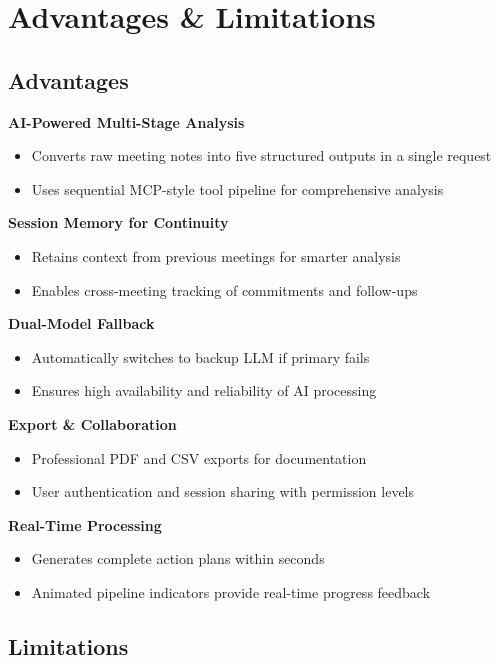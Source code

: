 \documentclass[12pt,a4paper]{article}
\begin{document}
\section{Advantages \& Limitations}

\subsection{Advantages}

\textbf{AI-Powered Multi-Stage Analysis}
\begin{itemize}
  \item Converts raw meeting notes into five structured outputs in a single request
  \item Uses sequential MCP-style tool pipeline for comprehensive analysis
\end{itemize}

\textbf{Session Memory for Continuity}
\begin{itemize}
  \item Retains context from previous meetings for smarter analysis
  \item Enables cross-meeting tracking of commitments and follow-ups
\end{itemize}

\textbf{Dual-Model Fallback}
\begin{itemize}
  \item Automatically switches to backup LLM if primary fails
  \item Ensures high availability and reliability of AI processing
\end{itemize}

\textbf{Export \& Collaboration}
\begin{itemize}
  \item Professional PDF and CSV exports for documentation
  \item User authentication and session sharing with permission levels
\end{itemize}

\textbf{Real-Time Processing}
\begin{itemize}
  \item Generates complete action plans within seconds
  \item Animated pipeline indicators provide real-time progress feedback
\end{itemize}

\subsection{Limitations}
\end{document}
